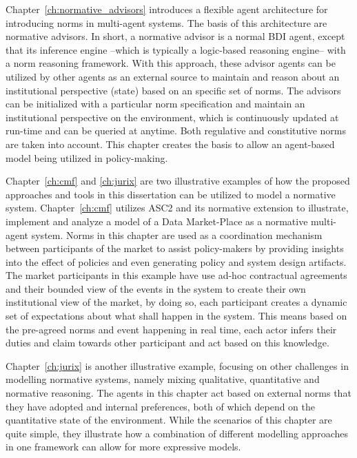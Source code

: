 Chapter~\ref{ch:normative_advisors} introduces a flexible agent architecture for introducing norms in multi-agent systems. The basis of this architecture are normative advisors. In short, a normative advisor is a normal BDI agent, except that its inference engine --which is typically a logic-based reasoning engine-- with a norm reasoning framework. With this approach, these advisor agents can be utilized by other agents as an external source to maintain and reason about an institutional perspective (state) based on an specific set of norms. The advisors can be initialized with a particular norm specification and maintain an institutional perspective on the environment, which is continuously updated at run-time and can be queried at anytime. Both regulative and constitutive norms are taken into account. This chapter creates the basis to allow an agent-based model being utilized in policy-making.


Chapter~\ref{ch:cmf} and \ref{ch:jurix} are two illustrative examples of how the proposed approaches and tools in this dissertation can be utilized to model a normative system. Chapter~\ref{ch:cmf} utilizes ASC2 and its normative extension to illustrate, implement and analyze a model of a Data Market-Place as a normative multi-agent system. Norms in this chapter are used as a coordination mechanism between participants of the market to assist policy-makers by providing insights into the effect of policies and even generating policy and system design artifacts. The market participants in this example have use ad-hoc contractual agreements and their bounded view of the events in the system to create their own institutional view of the market, by doing so, each participant creates a dynamic set of expectations about what shall happen in the system. This means based on the pre-agreed norms and event happening in real time, each actor infers their duties and claim towards other participant and act based on this knowledge. 

Chapter~\ref{ch:jurix} is another illustrative example, focusing on other challenges in modelling normative systems, namely mixing qualitative, quantitative and normative reasoning. The agents in this chapter act based on external norms that they have adopted and internal preferences, both of which depend on the quantitative state of the environment. While the scenarios of this chapter are quite simple, they illustrate how a combination of different modelling approaches in one framework can allow for more expressive models.



